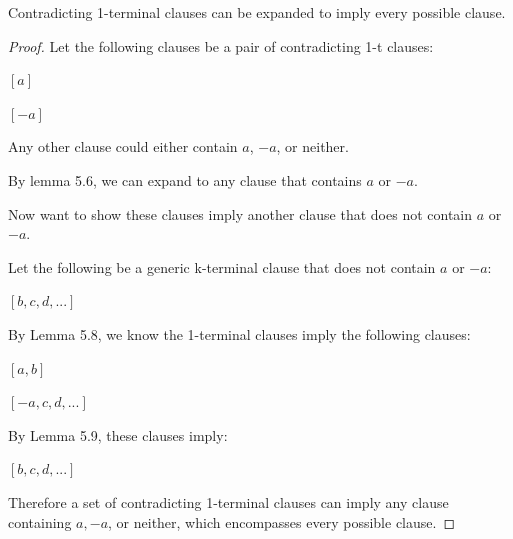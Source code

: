 \documentclass[manuscript]{acmart}
\begin{document}
    \begin{lemma}
        Contradicting 1-terminal clauses can be expanded to imply every possible clause.
    \end{lemma}
    \begin{proof}
        Let the following clauses be a pair of contradicting 1-t clauses:

        $[a]$

        $[-a]$

        Any other clause could either contain $a$, $-a$, or neither.

        By lemma 5.6, we can expand to any clause that contains $a$ or $-a$.

        Now want to show these clauses imply another clause that does not contain  $a$ or $-a$.

        Let the following be a generic k-terminal clause that does not contain $a$ or $-a$:

        $[b, c, d, ...]$

        By Lemma 5.8, we know the 1-terminal clauses imply the following clauses:

        $[a, b]$

        $[-a, c, d, ...]$

        By Lemma 5.9, these clauses imply:

        $[b, c, d, ...]$

        Therefore a set of contradicting 1-terminal clauses can imply any clause containing $a, -a$, or neither, which encompasses every possible clause.
    \end{proof}
\end{document}

